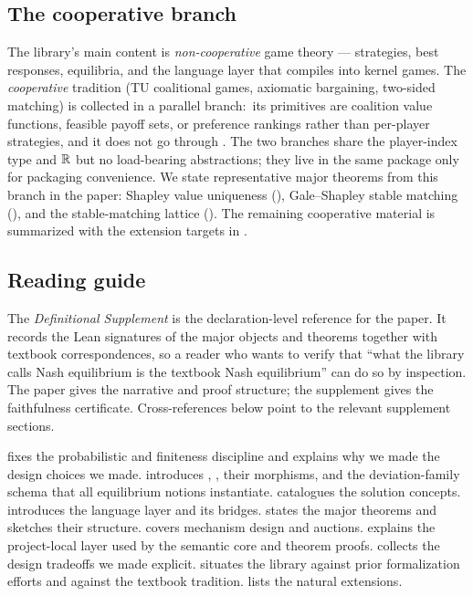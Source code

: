 \subsection{The cooperative branch}

The library's main content is \emph{non-cooperative} game theory
— strategies, best responses, equilibria, and the language layer
that compiles into kernel games.  The \emph{cooperative}
tradition (TU coalitional games, axiomatic bargaining, two-sided
matching) is collected in a parallel  branch:\
its primitives are coalition value functions, feasible payoff
sets, or preference rankings rather than per-player strategies,
and it does not go through .  The two branches
share the player-index type and $\mathbb{R}$ but no load-bearing
abstractions; they live in the same package only for packaging
convenience.  We state representative major theorems from this
branch in the paper: Shapley value uniqueness
(), Gale--Shapley stable matching
(), and the stable-matching lattice
().  The remaining cooperative
material is summarized with the extension targets in
.

\subsection{Reading guide}

The \emph{Definitional Supplement} is the declaration-level reference
for the paper.  It records the Lean signatures of the major objects
and theorems together with textbook correspondences, so a reader who
wants to verify that ``what the library calls Nash equilibrium is the
textbook Nash equilibrium'' can do so by inspection.  The paper gives
the narrative and proof structure; the supplement gives the
faithfulness certificate.  Cross-references below point to the
relevant supplement sections.

 fixes the probabilistic and finiteness
discipline and explains why we made the design choices we made.
 introduces , ,
their morphisms, and the deviation-family schema that all
equilibrium notions instantiate.  
catalogues the solution concepts.   introduces
the language layer and its bridges.  \Cref{sec:theorems} states the
major theorems and sketches their structure.
 covers mechanism design and auctions.
\Cref{sec:math-layer} explains the project-local \TT{Math/} layer
used by the semantic core and theorem proofs.
 collects the design tradeoffs we made
explicit.   situates the library against
prior formalization efforts and against the textbook tradition.
 lists the natural extensions.
